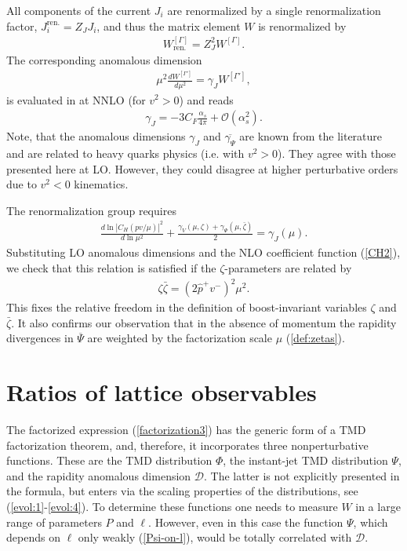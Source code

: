 \documentclass[a4paper, amsfonts, amssymb, amsmath, reprint, showkeys, nofootinbib, twoside]{revtex4-1}
\newcommand{\nn}{\nonumber}
\renewcommand{\(}{\left(}
\renewcommand{\)}{\right)}
\renewcommand{\[}{\left[}
\renewcommand{\]}{\right]}
\begin{document}
All components of the current $J_i$ are renormalized by a single renormalization factor, $J_i^{\text{ren.}}=Z_{J} J_{i}$, and thus the matrix element $W$ is renormalized by
\begin{eqnarray}
W^{[\Gamma]}_{\text{ren.}}=Z_{J}^2W^{[\Gamma]}.
\end{eqnarray}
The corresponding anomalous dimension
\begin{eqnarray}
\mu^2 \frac{d W^{[\Gamma']}}{d\mu^2}=\gamma_J W^{[\Gamma']},
\end{eqnarray}
is evaluated in \cite{Chetyrkin:2003vi} at NNLO (for $v^2>0$) and reads
\begin{eqnarray}
\gamma_J=-3C_F\frac{\alpha_s}{4\pi}+\mathcal{O}(\alpha_s^2).
\end{eqnarray}
Note, that the anomalous dimensions $\gamma_J$ and $\overline{\gamma_{\Psi}}$ are known from the literature and are related to heavy quarks physics (i.e. with $v^2>0$). They agree with those presented here at LO. However, they could disagree at higher perturbative orders due to $v^2<0$ kinematics.


The renormalization group requires
\begin{eqnarray}\nn
\frac{d \ln |C_H(pv/\mu)|^2}{d\ln \mu^2}+\frac{\gamma_V(\mu,\zeta)+\gamma_{\Psi}(\mu,\bar \zeta)}{2}=\gamma_J(\mu).
\end{eqnarray}
Substituting LO anomalous dimensions and the NLO coefficient function (\ref{CH2}), we check that this relation is satisfied if the $\zeta$-parameters are related by
\begin{eqnarray}
\zeta\bar \zeta=(2\hat p^+v^-)^2\mu^2.
\end{eqnarray}
This fixes the relative freedom in the definition of boost-invariant variables $\zeta$ and $\bar \zeta$. It also confirms our observation that in the absence of momentum the rapidity divergences in $\overline{\Psi}$ are weighted by the factorization scale $\mu$ (\ref{def:zetas}).



\section{Ratios of lattice observables}
\label{sec:ratios}

The factorized expression (\ref{factorization3}) has the generic form of a TMD factorization theorem, and, therefore, it incorporates three nonperturbative functions. These are the TMD distribution $\Phi$, the instant-jet TMD distribution $\Psi$, and the rapidity anomalous dimension $\mathcal{D}$. The latter is not explicitly presented in the formula, but enters via the scaling properties of the distributions, see (\ref{evol:1}-\ref{evol:4}). To determine these functions one needs to measure $W$ in a large range of parameters $P$ and $\ell$. However, even in this case the function $\Psi$, which depends on $\ell$ only weakly (\ref{Psi-on-l}), would be totally correlated with $\mathcal{D}$.
\end{document}
